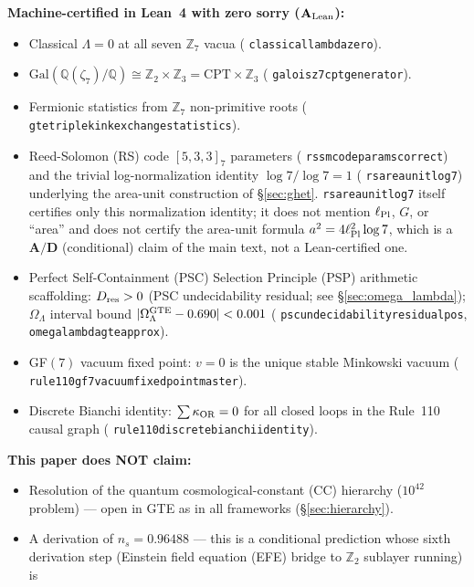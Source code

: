 \documentclass[11pt]{article}
\theoremstyle{remark}
\newcommand{\ZS}{\mathbb{Z}_7}
\newcommand{\lean}[1]{%
  \penalty-100
  \begingroup\def\_{\textunderscore\allowbreak}\texttt{#1}\endgroup}
\newcommand{\lPl}{\ell_{\rm Pl}}
\newcommand{\Omegalam}{\Omega_\Lambda}
\newcommand{\Dres}{D_{\rm res}}
\newcommand{\CatAL}{\ensuremath{\textbf{A}_{\rm Lean}}}
\newcommand{\CatAD}{\textbf{A/D}}
\begin{document}
\begin{tcolorbox}[colback=orange!6,colframe=orange!70!black,
  title={\textbf{What this paper claims and does not claim}},
  fonttitle=\bfseries,left=6pt,right=6pt,top=5pt,bottom=5pt]
\textbf{Machine-certified in Lean~4 with zero sorry ($\CatAL$):}
\begin{itemize}[noitemsep,topsep=2pt]
  \item Classical $\Lambda=0$ at all seven $\ZS$ vacua
        (\lean{classical\_lambda\_zero}).
  \item $\mathrm{Gal}(\mathbb{Q}(\zeta_7)/\mathbb{Q})\cong\mathbb{Z}_2\times\mathbb{Z}_3
        = \text{CPT}\times\mathbb{Z}_3$
        (\lean{galois\_z7\_cpt\_generator}).
  \item Fermionic statistics from $\ZS$ non-primitive roots
        (\lean{gte\_triple\_kink\allowbreak\_exchange\_statistics}).
  \item Reed-Solomon (RS) code $[5,3,3]_7$ parameters
        (\lean{rs\_sm\_code\_params\_correct}) and the trivial log-normalization
        identity $\log 7/\log 7=1$ (\lean{rs\_area\_unit\_log7}) underlying the
        area-unit construction of \S\ref{sec:ghet}. \lean{rs\_area\_unit\_log7} itself
        certifies only this normalization identity; it does not mention
        $\lPl$, $G$, or ``area'' and does not certify the area-unit formula
        $a^2=4\lPl^2\log 7$, which is a $\CatAD$ (conditional) claim of the main text,
        not a Lean-certified one.
  \item Perfect Self-Containment (PSC) Selection Principle (PSP) arithmetic scaffolding:
        $\Dres>0$ (PSC undecidability residual; see \S\ref{sec:omega_lambda}); $\Omegalam$ interval bound
        $|\Omegalam^{\rm GTE}-0.690|<0.001$
        (\lean{psc\_undecidability\_residual\_pos}, \lean{omega\_lambda\_gte\_approx}).
  \item GF$(7)$ vacuum fixed point: $v=0$ is the unique stable Minkowski vacuum
        (\lean{rule110\_gf7\_vacuum\_fixed\_point\_master}).
  \item Discrete Bianchi identity: $\sum\kappa_{\rm OR}=0$ for all closed loops in
        the Rule~110 causal graph
        (\lean{rule110\_discrete\_bianchi\_identity}).
\end{itemize}
\textbf{This paper does NOT claim:}
\begin{itemize}[noitemsep,topsep=2pt]
  \item Resolution of the quantum cosmological-constant (CC) hierarchy ($10^{42}$ problem) --- open in GTE
        as in all frameworks (\S\ref{sec:hierarchy}).
  \item A derivation of $n_s = 0.96488$ --- this is a conditional prediction whose
        sixth derivation step (Einstein field equation (EFE) bridge to $\mathbb{Z}_2$ sublayer running) is

\end{itemize}
\end{tcolorbox}
\end{document}
